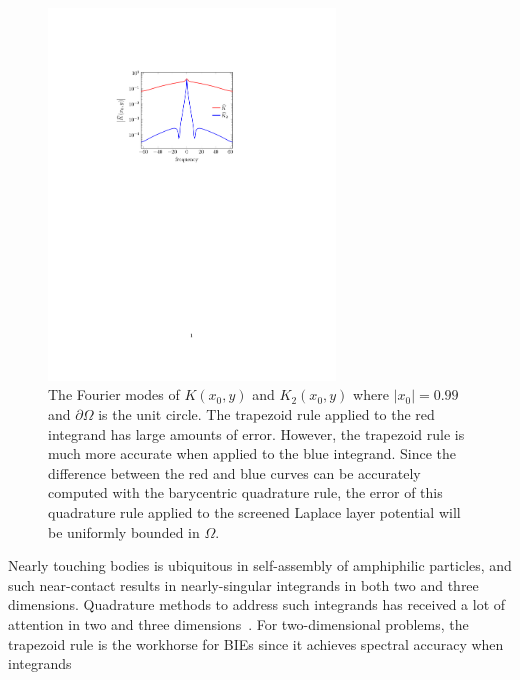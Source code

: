\begin{figure}
\centerline{\includegraphics[width=3.0in]{figures/integrands}}
\vspace*{-10pt}
\caption{{\footnotesize The Fourier modes of $K(x_0,y)$ and $K_2(x_0,y)$
  where $|x_0| = 0.99$ and $\partial\Omega$ is the unit circle. The
  trapezoid rule applied to the red integrand has large amounts of
  error. However, the trapezoid rule is much more accurate when applied
  to the blue integrand. Since the difference between the red and blue
  curves can be accurately computed with the barycentric quadrature
  rule, the error of this quadrature rule applied to the screened
  Laplace layer potential will be uniformly bounded in $\Omega$.}}
\label{fig:integrands}
\end{figure}
Nearly touching bodies is ubiquitous in self-assembly of amphiphilic
particles, and such near-contact results in nearly-singular integrands
in both two and three dimensions. Quadrature methods to address such
integrands has received a lot of attention in two and three
dimensions~\cite{alpert, kapur, sidi, duffy, bruno1, bruno2, davis_1984,
graglia_2008, hackbusch_sauter_1994, jarvenpaa_2003, khayat_2005,
schwab_1992, ying_2006, beale1, beale2, goodman_1990, haroldson_1998,
lowengrub_1993, schwab_1992, ggq1, ggq2, ggq3, helsing_2008a,
helsing_integral_2009, helsing_tutorial_2012, klockner2013jcp, qbx2,
wala2019jcp, af2018sisc, siegel2018jcp, rachh2017jcp, ding2019arxiv,
bar2014}. For two-dimensional problems, the trapezoid rule is the
workhorse for BIEs since it achieves spectral accuracy when integrands
